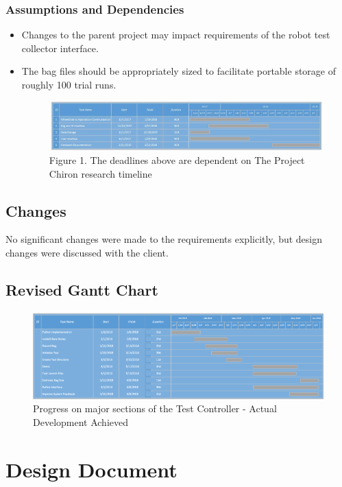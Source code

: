 \documentclass[onecolumn, draftclsnofoot,10pt, compsoc]{report}
\begin{document}
	\subsection{Assumptions and Dependencies}
	\begin{itemize}
		\item Changes to the parent project may impact requirements of the robot test collector interface.
		\item The bag files should be appropriately sized to facilitate portable storage of roughly 100 trial runs.
		\begin{figure}[h!]
			
			\centering
			\includegraphics[width=\linewidth, scale=0.7]{PrelimGanttChart.jpg}
			Figure 1. The deadlines above are dependent on The Project Chiron research timeline
		\end{figure}
		
	\end{itemize}
\section{Changes}
No significant changes were made to the requirements explicitly, but design changes were discussed with the client.
	
\section{Revised Gantt Chart}

\begin{figure}[h]
	\centering
	\includegraphics[width=0.7\linewidth]{"Revised Gantt"}
	\caption{Progress on major sections of the Test Controller - Actual Development Achieved}
	\label{fig:revised-gantt}
\end{figure}


\chapter{Design Document}
\minitoc
\end{document}
